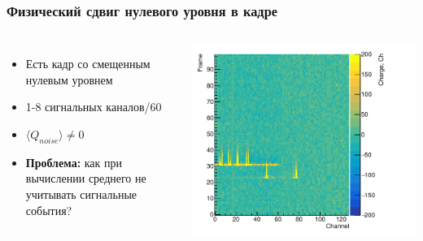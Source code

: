 \documentclass[14pt]{beamer}
\begin{document}
\begin{frame}[t]
\frametitle{Физический сдвиг нулевого уровня в кадре}
\vspace{0pt}
\begin{columns}
	\begin{minipage}[t][1\textheight]{\linewidth}
		\small{\begin{itemize}
				\item Есть кадр со смещенным нулевым уровнем
				\item 1-8 сигнальных каналов/60
				\item $\langle Q_{noise}\rangle \neq 0 $
				\item \textbf{Проблема:} как при вычислении среднего не учитывать сигнальные события?
		\end{itemize}}
	\end{minipage}%
	\begin{minipage}[t][1\textheight]{\linewidth}
		\hspace*{5pt}
		\centering\includegraphics[width=1.05\linewidth]{median_monitor.pdf}
	
		
	\end{minipage}%
\end{columns}
\end{frame}
\end{document}
